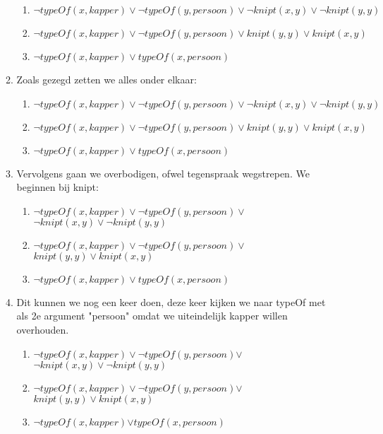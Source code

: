 \documentclass[]{article}
\begin{document}
\begin{enumerate}[a]
\begin{enumerate}[i]
\begin{enumerate}[1]
        \item $\lnot typeOf(x, kapper) \lor \lnot typeOf(y, persoon) \lor \lnot knipt(x, y) \lor \lnot knipt(y, y)$
        \item $ \lnot typeOf(x, kapper) \lor \lnot typeOf(y, persoon) \lor knipt(y, y) \lor knipt(x, y) $
        \item $ \lnot typeOf(x,kapper) \lor typeOf(x,persoon) $
      \end{enumerate}
      \item Zoals gezegd zetten we alles onder elkaar:
      \begin{enumerate}[1]
        \item $\lnot typeOf(x, kapper) \lor \lnot typeOf(y, persoon) \lor \lnot knipt(x, y) \lor \lnot knipt(y, y)$
        \item $ \lnot typeOf(x, kapper) \lor \lnot typeOf(y, persoon) \lor knipt(y, y) \lor knipt(x, y) $
        \item $ \lnot typeOf(x,kapper) \lor typeOf(x,persoon) $
      \end{enumerate}
      \item Vervolgens gaan we overbodigen, ofwel tegenspraak wegstrepen. We beginnen bij knipt:
      \begin{enumerate}[1]
        \item $\lnot typeOf(x, kapper) \lor \lnot typeOf(y, persoon) \lor$\st{$ \lnot knipt(x, y) \lor \lnot knipt(y, y)$}
        \item $ \lnot typeOf(x, kapper) \lor \lnot typeOf(y, persoon) \lor$\st{$knipt(y, y) \lor knipt(x, y)$}
        \item $ \lnot typeOf(x,kapper) \lor typeOf(x,persoon) $
      \end{enumerate}
      \item Dit kunnen we nog een keer doen, deze keer kijken we naar typeOf met als 2e argument "persoon" omdat we uiteindelijk kapper willen overhouden.
      \begin{enumerate}[1]
        \item $ \lnot typeOf(x, kapper) \lor $\st{$\lnot typeOf(y, persoon)$}$ \lor$\st{$ \lnot knipt(x, y) \lor \lnot knipt(y, y)$}
        \item $ \lnot typeOf(x, kapper) \lor $\st{$\lnot typeOf(y, persoon)$}$ \lor$\st{$knipt(y, y) \lor knipt(x, y)$}
        \item $ \lnot typeOf(x,kapper) $\st{$\lor typeOf(x,persoon) $}

\end{enumerate}
\end{enumerate}
\end{enumerate}
\end{document}
